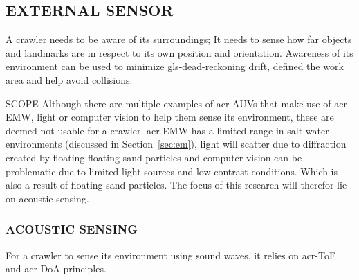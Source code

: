\subsection{EXTERNAL SENSOR}\label{sec:sensorenvironment}

A crawler needs to be aware of its surroundings; It needs to sense how far objects and landmarks are in respect to its
own position and orientation. Awareness of its environment can be used to minimize \gls{gls-dead-reckoning} drift,
defined the work area and help avoid collisions.

\begin{RoyalNote}{SCOPE}
	Although there are multiple examples of \gls{acr-AUV}s that make use of \gls{acr-EMW}, light or computer vision to
	help  them sense its environment, these are deemed not usable for a crawler. \gls{acr-EMW} has a limited range in
	salt water  environments (discussed in Section~\ref{sec:em}), light will scatter due to diffraction created by floating
	floating sand  particles and computer vision can be problematic due to limited light sources and low contrast
	conditions. Which is  also a result of floating sand particles. The focus of this research will therefor lie on
	acoustic sensing.
\end{RoyalNote}

\subsubsection{ACOUSTIC SENSING}

For a crawler to sense its environment using sound waves, it relies on \gls{acr-ToF} and \gls{acr-DoA} principles.
%
%
%
%
%
%
